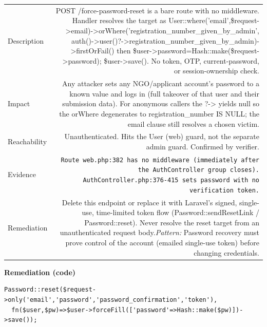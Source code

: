 \documentclass[11pt,a4paper]{article}
\begin{document}
{\renewcommand{\arraystretch}{1.35}%
\begin{tabularx}{\textwidth}{L R}
\toprule
Description & POST /force-password-reset is a bare route with no middleware. Handler resolves the target as User::where('email',\$request-\textgreater{}email)-\textgreater{}orWhere('registration\_number\_given\_by\_admin', auth()-\textgreater{}user()?-\textgreater{}registration\_number\_given\_by\_admin)-\textgreater{}firstOrFail() then \$user-\textgreater{}password=Hash::make(\$request-\textgreater{}password); \$user-\textgreater{}save(). No token, OTP, current-password, or session-ownership check. \\
Impact & Any attacker sets any NGO/applicant account's password to a known value and logs in (full takeover of that user and their submission data). For anonymous callers the ?-\textgreater{} yields null so the orWhere degenerates to registration\_number IS NULL; the email clause still resolves a chosen victim. \\
Reachability & Unauthenticated. Hits the User (web) guard, not the separate admin guard. Confirmed by verifier. \\
Evidence & \texttt{\small Route web.php:382 has no middleware (immediately after the AuthController group closes). AuthController.php:376-415 sets password with no verification token.} \\
Remediation & Delete this endpoint or replace it with Laravel's signed, single-use, time-limited token flow (Password::sendResetLink / Password::reset). Never resolve the reset target from an unauthenticated request body.\newline\emph{Pattern:} Password recovery must prove control of the account (emailed single-use token) before changing credentials. \\
\bottomrule
\end{tabularx}}

\vspace{4pt}\noindent\textbf{Remediation (code)}\par
\begin{lstlisting}
Password::reset($request->only('email','password','password_confirmation','token'),
  fn($user,$pw)=>$user->forceFill(['password'=>Hash::make($pw)])->save());
\end{lstlisting}
\end{document}
